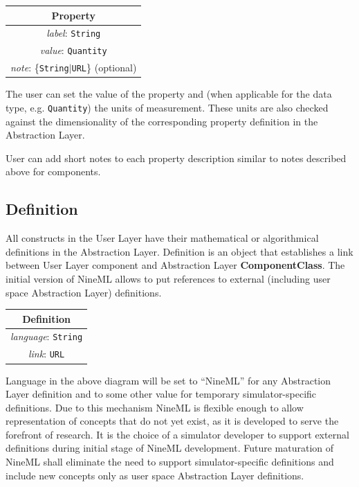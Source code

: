 \documentclass{article}
\newcommand{\ComponentClass}{{\bf{ComponentClass}}\xspace}
\begin{document}
\begin{table}[htb]
\center
\begin{tabular}{|c|}
\hline
\hline
Property \\
\hline
\hline
{\em label}: {\tt String} \\
\hline
{\em value}: {\tt Quantity} \\
\hline
{\em note}: \{{\tt String}$|${\tt URL}\} (optional)\\
\hline
\end{tabular}
\end{table}

The user can set the value of the property and (when applicable for the data
type, e.g. {\tt Quantity}) the units of measurement. These units are also
checked against the dimensionality of the corresponding property definition
in the Abstraction Layer.

User can add short notes to each property description similar to notes
described above for components.

\subsection{Definition}

All constructs in the User Layer have their mathematical or algorithmical
definitions in the Abstraction Layer. Definition is an object that
establishes a link between User Layer component and Abstraction Layer
\ComponentClass. The initial version of NineML allows to put references
to external (including user space Abstraction Layer) definitions.

\begin{table}[htb]
\center
\begin{tabular}{|c|}
\hline
\hline
Definition \\
\hline
\hline
{\em language}: {\tt String} \\
\hline
{\em link}: {\tt URL}\\
\hline
\end{tabular}
\end{table}

Language in the above diagram will be set to ``NineML'' for any Abstraction
Layer definition and to some other value for temporary simulator-specific
definitions. Due to this mechanism
NineML is flexible enough to allow representation of concepts that do not
yet exist, as it is developed to serve the forefront of research.
It is the choice of a simulator developer to support external definitions
during initial stage of NineML development. Future maturation of NineML shall
eliminate the need to support simulator-specific definitions and include new
concepts only as user space Abstraction Layer definitions.
\end{document}
